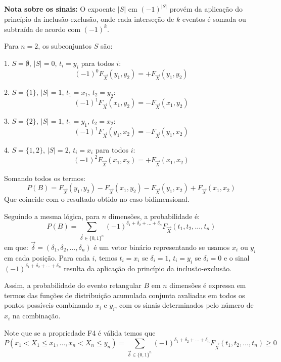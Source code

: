 \begin{frame}
	
{\bf Nota sobre os sinais:}	O expoente \( |S| \) em \( (-1)^{|S|} \) provém da aplicação do princípio da inclusão-exclusão, onde cada interseção de \( k \) eventos é somada ou subtraída de acordo com \( (-1)^{k} \).

\medskip
Para \( n = 2 \), os subconjuntos \( S \) são:

1. \( S = \emptyset \), \( |S| = 0 \), \( t_i = y_i \) para todos \( i \):
\[
(-1)^{0} F_{\vec{X}}(y_1, y_2) = +F_{\vec{X}}(y_1, y_2)
\]

2. \( S = \{1\} \), \( |S| = 1 \), \( t_1 = x_1 \), \( t_2 = y_2 \):
\[
(-1)^{1} F_{\vec{X}}(x_1, y_2) = -F_{\vec{X}}(x_1, y_2)
\]

3. \( S = \{2\} \), \( |S| = 1 \), \( t_1 = y_1 \), \( t_2 = x_2 \):
\[
(-1)^{1} F_{\vec{X}}(y_1, x_2) = -F_{\vec{X}}(y_1, x_2)
\]

4. \( S = \{1,2\} \), \( |S| = 2 \), \( t_i = x_i \) para todos \( i \):
\[
(-1)^{2} F_{\vec{X}}(x_1, x_2) = +F_{\vec{X}}(x_1, x_2)
\]

Somando todos os termos:
\[
P(B) = F_{\vec{X}}(y_1, y_2) - F_{\vec{X}}(x_1, y_2) - F_{\vec{X}}(y_1, x_2) + F_{\vec{X}}(x_1, x_2)
\]
Que coincide com o resultado obtido no caso bidimensional.
	
\end{frame}	

\begin{frame}
Seguindo a mesma lógica, para \( n \) dimensões, a probabilidade é:
\[
P(B) = \sum_{\vec{\delta} \in \{0,1\}^n} (-1)^{\delta_1 + \delta_2 + \ldots + \delta_n} F_{\vec{X}}(t_1, t_2, \ldots, t_n)
\]
em que: \( \vec{\delta} = (\delta_1, \delta_2, \ldots, \delta_n) \) é um vetor binário representando se usamos \( x_i \) ou \( y_i \) em cada posição. Para cada \( i \), temos \( t_i = x_i \) se \( \delta_i = 1 \),  \( t_i = y_i \) se \( \delta_i = 0 \) e
o sinal \( (-1)^{\delta_1 + \delta_2 + \ldots + \delta_n} \) resulta da aplicação do princípio da inclusão-exclusão.	

\medskip
Assim, a probabilidade do evento retangular \( B \) em \( n \) dimensões é expressa em termos das funções de distribuição acumulada conjunta avaliadas em todos os pontos possíveis combinando \( x_i \) e \( y_i \), com os sinais determinados pelo número de \( x_i \) na combinação.

\medskip
Note que se a propriedade F4 é válida temos que 
	\[
			P(x_1 < X_1 \leq x_1, \dots, x_n < X_n \leq y_n) =  \sum_{\vec{\delta} \in \{0,1\}^n} (-1)^{\delta_1 + \delta_2 + \ldots + \delta_n} F_{\vec{X}}(t_1, t_2, \ldots, t_n) \geq 0
			\]
\end{frame}	



